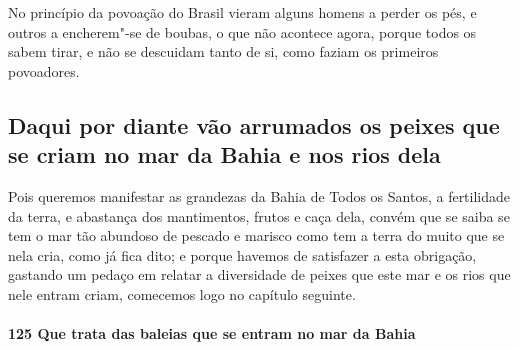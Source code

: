 No princípio da povoação do Brasil vieram alguns homens a perder os pés, e outros a
encherem"-se de boubas, o que não acontece agora, porque todos os sabem tirar, e não se
descuidam tanto de si, como faziam os primeiros povoadores.

\subsection{Daqui por diante vão arrumados os peixes que se criam no mar da Bahia e nos
rios dela}

Pois queremos manifestar as grandezas da Bahia de Todos os Santos, a fertilidade da terra,
e abastança dos mantimentos, frutos e caça dela, convém que se saiba se tem o mar tão
abundoso de pescado e marisco como tem a terra do muito que se nela cria, como já fica
dito; e porque havemos de satisfazer a esta obrigação, gastando um pedaço em relatar a
diversidade de peixes que este mar e os rios que nele entram criam, comecemos logo no
capítulo seguinte.

\paragraph{125 Que trata das baleias que se entram no mar da Bahia}

